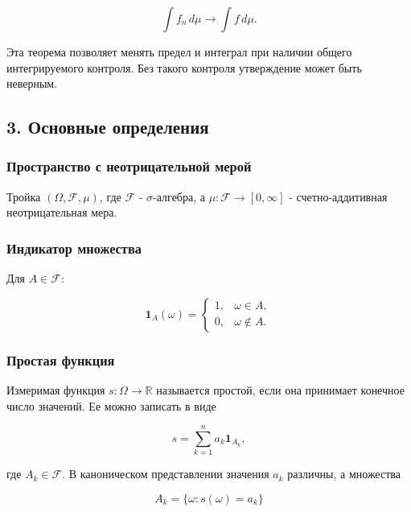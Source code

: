 \documentclass[
  11pt,
  a4paper,
]{article}
\begin{document}
\[
\int f_n\,d\mu\to\int f\,d\mu.
\]

Эта теорема позволяет менять предел и интеграл при наличии общего
интегрируемого контроля. Без такого контроля утверждение может быть
неверным.

\subsection{3. Основные
определения}\label{ux43eux441ux43dux43eux432ux43dux44bux435-ux43eux43fux440ux435ux434ux435ux43bux435ux43dux438ux44f}

\subsubsection{Пространство с неотрицательной
мерой}\label{ux43fux440ux43eux441ux442ux440ux430ux43dux441ux442ux432ux43e-ux441-ux43dux435ux43eux442ux440ux438ux446ux430ux442ux435ux43bux44cux43dux43eux439-ux43cux435ux440ux43eux439}

Тройка \((\Omega,\mathcal F,\mu)\), где \(\mathcal F\) -
\(\sigma\)-алгебра, а \(\mu:\mathcal F\to[0,\infty]\) -
счетно-аддитивная неотрицательная мера.

\subsubsection{Индикатор
множества}\label{ux438ux43dux434ux438ux43aux430ux442ux43eux440-ux43cux43dux43eux436ux435ux441ux442ux432ux430}

Для \(A\in\mathcal F\):

\[
\mathbf 1_A(\omega)=
\begin{cases}
1, & \omega\in A,\\
0, & \omega\notin A.
\end{cases}
\]

\subsubsection{Простая
функция}\label{ux43fux440ux43eux441ux442ux430ux44f-ux444ux443ux43dux43aux446ux438ux44f}

Измеримая функция \(s:\Omega\to\mathbb R\) называется простой, если она
принимает конечное число значений. Ее можно записать в виде

\[
s=\sum_{k=1}^n a_k\mathbf 1_{A_k},
\]

где \(A_k\in\mathcal F\). В каноническом представлении значения \(a_k\)
различны, а множества

\[
A_k=\{\omega:s(\omega)=a_k\}
\]
\end{document}
